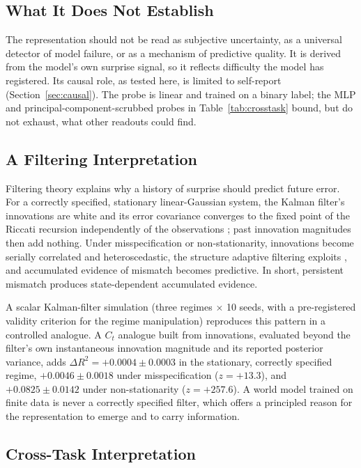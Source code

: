 \documentclass[a4paper,twoside]{article}
\begin{document}
\subsection{What It Does Not Establish}

The representation should not be read as subjective uncertainty, as a universal detector of model failure, or as a mechanism of predictive quality. It is derived from the model's own surprise signal, so it reflects difficulty the model has registered. Its causal role, as tested here, is limited to self-report (Section~\ref{sec:causal}). The probe is linear and trained on a binary label; the MLP and principal-component-scrubbed probes in Table~\ref{tab:crosstask} bound, but do not exhaust, what other readouts could find.

\subsection{A Filtering Interpretation}

Filtering theory explains why a history of surprise should predict future error. For a correctly specified, stationary linear-Gaussian system, the Kalman filter's innovations are white and its error covariance converges to the fixed point of the Riccati recursion independently of the observations \cite{kalman1960filter}; past innovation magnitudes then add nothing. Under misspecification or non-stationarity, innovations become serially correlated and heteroscedastic, the structure adaptive filtering exploits \cite{mehra1970adaptive}, and accumulated evidence of mismatch becomes predictive. In short, persistent mismatch produces state-dependent accumulated evidence.

A scalar Kalman-filter simulation (three regimes $\times$ 10 seeds, with a pre-registered validity criterion for the regime manipulation) reproduces this pattern in a controlled analogue. A $C_t$ analogue built from innovations, evaluated beyond the filter's own instantaneous innovation magnitude and its reported posterior variance, adds $\Delta R^2 = +0.0004 \pm 0.0003$ in the stationary, correctly specified regime, $+0.0046 \pm 0.0018$ under misspecification ($z = +13.3$), and $+0.0825 \pm 0.0142$ under non-stationarity ($z = +257.6$). A world model trained on finite data is never a correctly specified filter, which offers a principled reason for the representation to emerge and to carry information.

\subsection{Cross-Task Interpretation}
\end{document}
